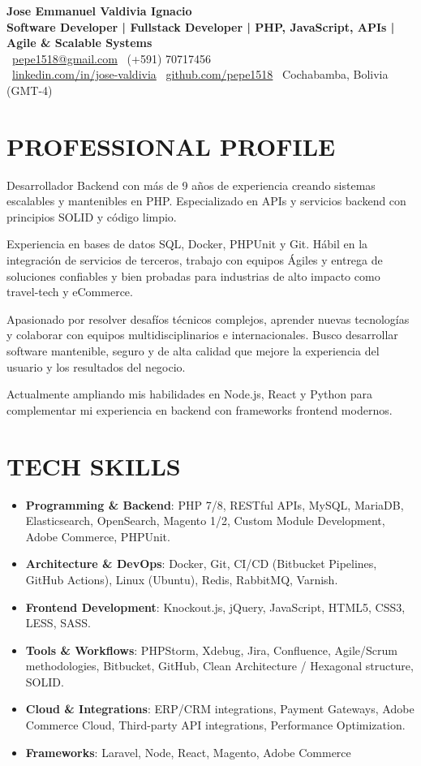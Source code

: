 \documentclass[11pt, a4paper]{article}
\newcommand{\header}[1]{\section*{\fontsize{10.5}{11}\selectfont\bfseries\color{accent}\uppercase{#1}}}
\begin{document}
\begin{center}
    {\large \textbf{Jose Emmanuel Valdivia Ignacio}} \\[5pt]
    {\small \textbf{Software Developer | Fullstack Developer | PHP, JavaScript, APIs | Agile \& Scalable Systems}} \\[8pt]
    
    \faEnvelope\ \href{mailto:pepe1518@gmail.com}{\color{linkcolor}pepe1518@gmail.com} \quad 
    \faPhone\ (+591) 70717456  \\
    \faLinkedin\ \href{https://linkedin.com/in/jose-valdivia-697044100}{\color{linkcolor}linkedin.com/in/jose-valdivia} \quad 
    \faGithub\ \href{https://github.com/pepe1518}{\color{linkcolor}github.com/pepe1518} \quad
    \faMapMarker\ Cochabamba, Bolivia \, (GMT-4) \quad
\end{center}

\header{Professional Profile}
Desarrollador Backend con más de 9 años de experiencia creando sistemas escalables y mantenibles en PHP. Especializado en APIs y servicios backend con principios SOLID y código limpio.
\par
Experiencia en bases de datos SQL, Docker, PHPUnit y Git. Hábil en la integración de servicios de terceros, trabajo con equipos Ágiles y entrega de soluciones confiables y bien probadas para industrias de alto impacto como travel-tech y eCommerce.
\par
Apasionado por resolver desafíos técnicos complejos, aprender nuevas tecnologías y colaborar con equipos multidisciplinarios e internacionales. Busco desarrollar software mantenible, seguro y de alta calidad que mejore la experiencia del usuario y los resultados del negocio. 
\par
Actualmente ampliando mis habilidades en Node.js, React y Python para complementar mi experiencia en backend con frameworks frontend modernos.

\header{Tech Skills}
\begin{itemize}[noitemsep, topsep=3pt]
    \item \textbf{Programming \& Backend}: PHP 7/8, RESTful APIs, MySQL, MariaDB, Elasticsearch, OpenSearch, Magento 1/2, Custom Module Development, Adobe Commerce, PHPUnit.
    \item \textbf{Architecture \& DevOps}: Docker, Git, CI/CD (Bitbucket Pipelines, GitHub Actions), Linux (Ubuntu), Redis, RabbitMQ, Varnish.
    \item \textbf{Frontend Development}: Knockout.js, jQuery, JavaScript, HTML5, CSS3, LESS, SASS.
	\item \textbf{Tools \& Workflows}: PHPStorm, Xdebug, Jira, Confluence, Agile/Scrum methodologies, Bitbucket, GitHub, Clean Architecture / Hexagonal structure, SOLID.
    \item \textbf{Cloud \& Integrations}: ERP/CRM integrations, Payment Gateways, Adobe Commerce Cloud, Third-party API integrations, Performance Optimization.
    \item \textbf{Frameworks}: Laravel, Node, React, Magento, Adobe Commerce
\end{itemize}
\end{document}
